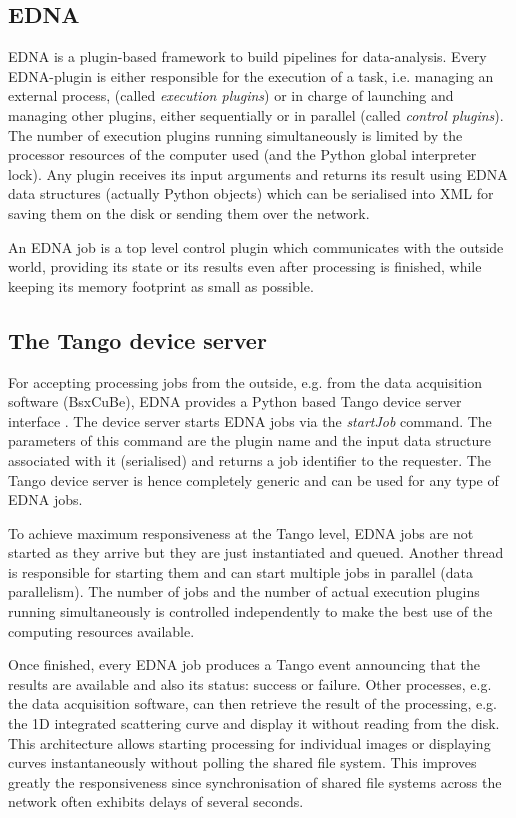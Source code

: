 \documentclass[preprint,pdf]{iucr}              %
\begin{document}
\subsection{EDNA}
EDNA \cite{EDNA} is a plugin-based framework to build pipelines for data-analysis.
Every EDNA-plugin is either responsible
for the execution of a task, i.e. managing an external process,
(called \textit{execution plugins}) or in charge of launching and managing other plugins, either sequentially or in
parallel (called \textit{control plugins}).
The number of execution plugins running simultaneously is limited by the
processor resources of the computer used (and the Python global interpreter
lock).
Any plugin receives its input arguments and returns its result using
EDNA data structures (actually Python objects) which can be serialised into XML
for saving them on the disk or sending them over the network.

An EDNA job is a top level control plugin which communicates with the outside
world, providing its state or its results even after processing is finished,
while keeping its memory footprint as small as possible.

\subsection{The Tango device server}
For accepting processing jobs from the outside, e.g. from the data
acquisition software (BsxCuBe), EDNA provides a Python based Tango device
server interface \cite{tango,pytango}.
The device server starts EDNA jobs via the \textit{startJob} command.
The parameters of this command are the plugin name and the input data structure
associated with it (serialised) and returns a job identifier to the requester.
The Tango device server is hence completely generic and can be used for any
type of EDNA jobs.

To achieve maximum responsiveness at the Tango level, EDNA jobs are not started as
they arrive but they are just instantiated and queued.
Another thread is responsible for starting them and can start multiple jobs in parallel
(data parallelism).
The number of jobs and the number of actual execution
plugins running simultaneously is controlled independently to make the best use
of the computing resources available.

Once finished, every EDNA job produces  a Tango event announcing that the
results are available and also its status: success or failure.
Other processes, e.g. the data acquisition software, can then retrieve the result
of the processing, e.g. the 1D integrated scattering curve and
display it without reading from the disk.
This architecture allows starting processing for individual images or
displaying curves instantaneously without polling the shared file system.
This improves greatly the responsiveness since synchronisation of shared
file systems across the network often exhibits delays of several
seconds.
\end{document}
